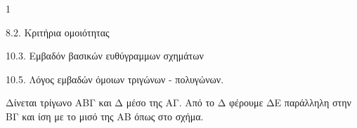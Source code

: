 \begin{ylh}{1}
    \item 8.2. Κριτήρια ομοιότητας
    \item 10.3. Εμβαδόν βασικών ευθύγραμμων σχημάτων
    \item 10.5. Λόγος εμβαδών όμοιων τριγώνων - πολυγώνων.
\end{ylh}
\begin{figure}
\end{figure}
Δίνεται τρίγωνο ΑΒΓ και Δ μέσο της ΑΓ. Από το Δ φέρουμε ΔΕ παράλληλη στην ΒΓ και ίση με το μισό της ΑΒ όπως στο σχήμα.

